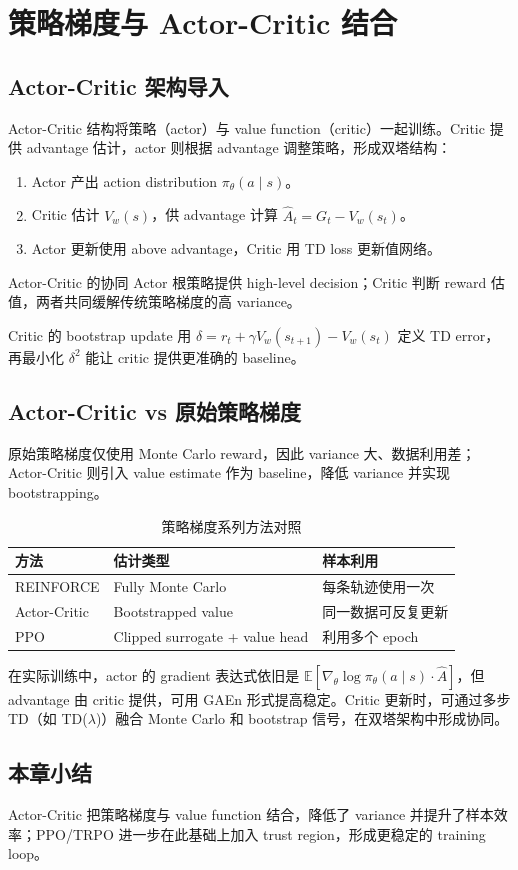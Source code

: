 \section{策略梯度与 Actor-Critic 结合}
\subsection{Actor-Critic 架构导入}
Actor-Critic 结构将策略（actor）与 value function（critic）一起训练。Critic 提供 advantage 估计，actor 则根据 advantage 调整策略，形成双塔结构：
\begin{enumerate}
    \item Actor 产出 action distribution $\pi_\theta(a\mid s)$。
    \item Critic 估计 $V_w(s)$，供 advantage 计算 $\hat{A}_t = G_t - V_w(s_t)$。
    \item Actor 更新使用 above advantage，Critic 用 TD loss 更新值网络。
\end{enumerate}
\begin{knowledgebox}{Actor-Critic 的协同}
Actor 根策略提供 high-level decision；Critic 判断 reward 估值，两者共同缓解传统策略梯度的高 variance。
\end{knowledgebox}

Critic 的 bootstrap update 用 $\delta = r_t + \gamma V_w(s_{t+1}) - V_w(s_t)$ 定义 TD error，再最小化 $\delta^2$ 能让 critic 提供更准确的 baseline。

\subsection{Actor-Critic vs 原始策略梯度}
原始策略梯度仅使用 Monte Carlo reward，因此 variance 大、数据利用差；Actor-Critic 则引入 value estimate 作为 baseline，降低 variance 并实现 bootstrapping。
\begin{table}[H]
\centering
\small
\begin{tabular}{p{}p{}p{}}
\toprule
方法 & 估计类型 & 样本利用 \\
\midrule
REINFORCE & Fully Monte Carlo & 每条轨迹使用一次 \\
Actor-Critic & Bootstrapped value & 同一数据可反复更新 \\
PPO & Clipped surrogate + value head & 利用多个 epoch \\
\bottomrule
\end{tabular}
\caption{策略梯度系列方法对照}
\end{table}

在实际训练中，actor 的 gradient 表达式依旧是 $\mathbb{E}[\nabla_\theta \log \pi_\theta(a\mid s) \cdot \hat{A}]$，但 advantage 由 critic 提供，可用 GAEn 形式提高稳定。Critic 更新时，可通过多步 TD（如 TD($\lambda$)）融合 Monte Carlo 和 bootstrap 信号，在双塔架构中形成协同。

\subsection{本章小结}
Actor-Critic 把策略梯度与 value function 结合，降低了 variance 并提升了样本效率；PPO/TRPO 进一步在此基础上加入 trust region，形成更稳定的 training loop。

